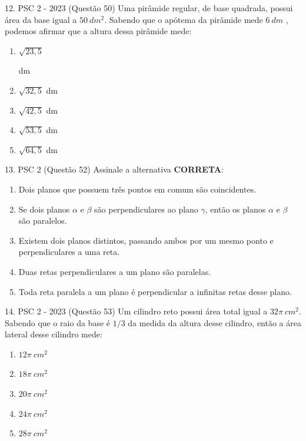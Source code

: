 \documentclass[aspectratio=169]{beamer}
\newif\ifusarcorvermelha
\newcommand{\vermelho}[1]{%
    \ifusarcorvermelha
        {\color{red}#1}%
    \else
        #1%
    \fi
}
\begin{document}
    \begin{frame}{12. PSC 2 - 2023 (Questão 50)}
       Uma pirâmide regular, de base quadrada, possui área da base igual a $50 \ dm^{2}$. Sabendo que o apótema da pirâmide mede $6 \ dm$ , podemos afirmar que a altura dessa pirâmide mede:


         \begin{enumerate}[a]
                    \item \vermelho{$\sqrt{23,5}$} dm %
                    \item $\sqrt{32,5}$ dm
                    \item $\sqrt{42,5}$ dm
                    \item $\sqrt{53,5}$ dm
                    \item $\sqrt{64,5}$ dm
                \end{enumerate}        
    \end{frame}

    \begin{frame}{13. PSC 2 (Questão 52)}
       Assinale a alternativa \textbf{CORRETA}:


         \begin{enumerate}[a]
                    \item Dois planos que possuem três pontos em comum são coincidentes.
                    \item Se dois planos $\alpha$ e $\beta$ são perpendiculares ao plano $\gamma$, então os planos $\alpha$ e $\beta$ são paralelos.
                    \item Existem dois planos distintos, passando ambos por um mesmo ponto e perpendiculares a uma reta.
                    \item \vermelho{Duas retas perpendiculares a um plano são paralelas.} %
                    \item Toda reta paralela a um plano é perpendicular a infinitas retas desse plano.

                \end{enumerate}        
    \end{frame}

    \begin{frame}{14. PSC 2 - 2023 (Questão 53)}
      Um cilindro reto possui área total igual a $32\pi \ cm^{2}$. Sabendo que o raio da base é ${1}/{3}$ da medida da altura desse cilindro, então a área lateral desse cilindro mede:
       
         \begin{enumerate}[a]
                    \item $12\pi \ cm^{2}$
                    \item $18\pi \ cm^{2}$
                    \item $20\pi \ cm^{2}$
                    \item \vermelho{$24\pi \ cm^{2}$} %
                    \item $28\pi \ cm^{2}$

                \end{enumerate}        
    \end{frame}
\end{document}
